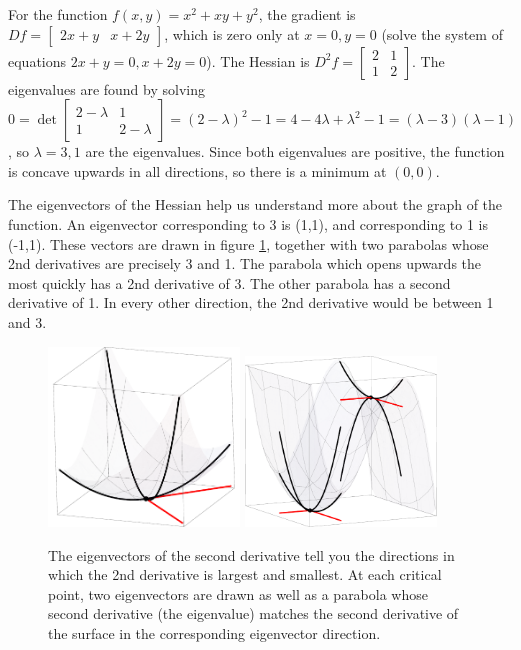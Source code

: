 \begin{example}
For the function {$f(x,y)=x^2+xy+y^2$}, the gradient is $Df = \begin{bmatrix}2x+y&x+2y \end{bmatrix}$, which is zero only at $x=0,y=0$ (solve the system of equations $2x+y=0,x+2y=0$). The Hessian is $D^2f = \begin{bmatrix}2&1 \\1&2\end{bmatrix}$. The eigenvalues are found by solving $0=\det \begin{bmatrix}2-\lambda &1 \\1&2-\lambda \end{bmatrix} = (2-\lambda)^2-1 = 4-4\lambda+\lambda^2 -1 = (\lambda-3)(\lambda-1)$, so $\lambda = 3,1$ are the eigenvalues.  Since both eigenvalues are positive, the function is concave upwards in all directions, so there is a minimum at $(0,0)$.  

The eigenvectors of the Hessian help us understand more about the graph of the function.  An eigenvector corresponding to 3 is (1,1), and corresponding to 1 is (-1,1). These vectors are drawn in figure \ref{2ndder}, together with two parabolas whose 2nd derivatives are precisely 3 and 1.  The parabola which opens upwards the most quickly has a 2nd derivative of 3.  The other parabola has a second derivative of 1. In every other direction, the 2nd derivative would be between 1 and 3.

\end{example}

\begin{figure}[ht
]\begin{center}
\includegraphics[width=2in]{support/2nddertest1}
\hspace{.5in}
\includegraphics[width=2in]{support/2nddertest2}
\end{center}
\caption{The eigenvectors of the second derivative tell you the directions in which the 2nd derivative is largest and smallest. At each critical point, two eigenvectors are drawn as well as a parabola whose second derivative (the eigenvalue) matches the second derivative of the surface in the corresponding eigenvector direction.}
\label{2ndder}
\end{figure}


